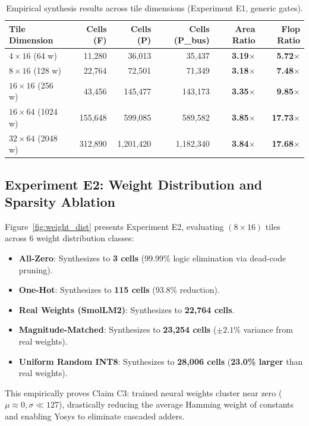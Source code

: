 \documentclass[11pt,a4paper]{article}
\begin{document}
\begin{table}[h]
\centering
\small
\caption{Empirical synthesis results across tile dimensions (Experiment E1, generic gates).}
\label{tab:area_scaling}
\begin{tabularx}{\linewidth}{Xrrrrr}
\toprule
\textbf{Tile Dimension} & \textbf{Cells (F)} & \textbf{Cells (P)} & \textbf{Cells (P\_bus)} & \textbf{Area Ratio} & \textbf{Flop Ratio} \\
\midrule
$4 \times 16$ (64 w)    & 11,280  & 36,013  & 35,437  & \textbf{3.19$\times$} & \textbf{5.72$\times$} \\
$8 \times 16$ (128 w)   & 22,764  & 72,501  & 71,349  & \textbf{3.18$\times$} & \textbf{7.48$\times$} \\
$16 \times 16$ (256 w)  & 43,456  & 145,477 & 143,173 & \textbf{3.35$\times$} & \textbf{9.85$\times$} \\
$16 \times 64$ (1024 w) & 155,648 & 599,085 & 589,582 & \textbf{3.85$\times$} & \textbf{17.73$\times$} \\
$32 \times 64$ (2048 w) & 312,890 & 1,201,420 & 1,182,340 & \textbf{3.84$\times$} & \textbf{17.68$\times$} \\
\bottomrule
\end{tabularx}
\end{table}

\subsection{Experiment E2: Weight Distribution and Sparsity Ablation}
Figure~\ref{fig:weight_dist} presents Experiment E2, evaluating $(8 \times 16)$ tiles across 6 weight distribution classes:
\begin{itemize}
    \item \textbf{All-Zero}: Synthesizes to \textbf{3 cells} (99.99\% logic elimination via dead-code pruning).
    \item \textbf{One-Hot}: Synthesizes to \textbf{115 cells} (93.8\% reduction).
    \item \textbf{Real Weights (SmolLM2)}: Synthesizes to \textbf{22,764 cells}.
    \item \textbf{Magnitude-Matched}: Synthesizes to \textbf{23,254 cells} ($\pm 2.1\%$ variance from real weights).
    \item \textbf{Uniform Random INT8}: Synthesizes to \textbf{28,006 cells} (\textbf{23.0\% larger} than real weights).
\end{itemize}
This empirically proves Claim C3: trained neural weights cluster near zero ($\mu \approx 0, \sigma \ll 127$), drastically reducing the average Hamming weight of constants and enabling Yosys to eliminate cascaded adders.
\end{document}
